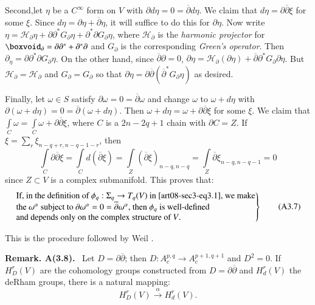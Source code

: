 Second,\pageoriginale let $\eta$ be a $C^{\infty}$ form on $V$ with $\partial d\eta=0=\overline{\partial}d\eta$. We claim that $d\eta=\partial\overline{\partial}\xi$ for some $\xi$. Since $d\eta=\partial\eta+\overline{\partial}\eta$, it will suffice to do this for $\partial\eta$. Now write $\eta=\mathscr{H}_{\partial}\eta+\partial\partial^{*}G_{\partial}\eta+\partial^{*}\partial G_{\partial}\eta$, where $\mathscr{H}_{\partial}$ is the {\em harmonic projector} for $\boxvoid_{\partial}=\partial\partial^{*}+\partial^{*}\partial$ and $G_{\partial}$ is the corresponding {\em Green's operator}. Then $\partial_{\eta}=\partial\partial^{*}\partial G_{\partial}\eta$. On the other hand, since $\overline{\partial}\partial=0$, $\partial\eta=\mathscr{H}_{\partial}(\partial\eta)+\overline{\partial}\partial^{*}G_{\partial}\partial\eta$. But $\mathscr{H}_{\partial}=\mathscr{H}_{\partial}$ and $G_{\partial}=G_{\partial}$ so that $\partial\eta=\partial\overline{\partial}(\overline{\partial}^{*}G_{\partial}\eta)$ as desired.

Finally, let $\omega\in S$ satisfy $\partial \omega=0=\overline{\partial}\omega$ and change $\omega$ to $\omega+d\eta$ with $\partial(\omega+d\eta)=0=\overline{\partial}(\omega+d\eta)$. Then $\omega+d\eta=\omega+\partial\overline{\partial}\xi$ for some $\xi$. We claim that $\int\limits_{C}\omega=\int\limits_{C}\omega+\partial\overline{\partial}\xi$, where $C$ is a $2n-2q+1$ chain with $\partial C=Z$. If $\xi=\sum\limits_{r}\xi_{n-q+r,n-q-1-r}$, then
$$
\int\limits_{C}\partial\overline{\partial}\xi=\int\limits_{C}d(\overline{\partial}\xi)=\int\limits_{Z}(\overline{\partial}\xi)_{n-q,n-q}=\int\limits_{Z}\overline{\partial}\xi_{n-q,n-q-1}=0
$$
since $Z\subset V$ is a complex submanifold. This proves that:
\begin{equation*}
\left.
\begin{array}{@{}l@{}}
\text{If, in the definition of  $\phi_{q}:\Sigma_{q}\to T_{q}(V)$  in \eqref{art08-sec3-eq3.1}, we make}\\
\text{the $\omega^{\alpha}$ subject to $\partial\omega^{\alpha}=0=\overline{\partial}\omega^{\alpha}$, then $\phi_{q}$ is well-defined}\\
\text{and depends only on the complex structure of $V$.}
\end{array}
\right\}\tag{A3.7}\label{art08-sec3-eqA3.7}
\end{equation*}

This is the procedure followed by Weil \cite{art08-key22}.

\medskip
\noindent
{\bf Remark. A(3.8).}~ Let $D=\partial\overline{\partial}$; then $D:A^{p,q}_{c}\to A^{p+1,q+1}_{c}$ and $D^{2}=0$. If $H^{r}_{D}(V)$ are the cohomology groups constructed from $D=\partial\overline{\partial}$ and $H^{r}_{d}(V)$ the deRham groups, there is a natural mapping:
\begin{equation*}
H^{r}_{D}(V)\xrightarrow{\alpha}H^{r}_{d}(V).\tag{A3.9}\label{art08-sec3-eqA3.9}
\end{equation*}

